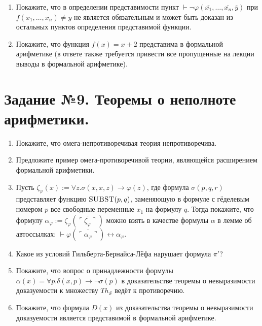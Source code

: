 \documentclass[10pt,a4paper,oneside]{article}
\begin{document}
\begin{enumerate}
\item Покажите, что в определении представимости пункт
$\vdash\neg\varphi(\overline{x_1},\dots,\overline{x_n},\overline{y})$ при $f(x_1,\dots,x_n) \ne y$ не является
обязательным и может быть доказан из остальных пунктов определения представимой функции.

\item Покажите, что функция $f(x) = x+2$ представима в формальной арифметике (в ответе также требуется привести все пропущенные
на лекции выводы в формальной арифметике).
\end{enumerate}

\section*{Задание №9. Теоремы о неполноте арифметики.}
\begin{enumerate}
\item Покажите, что омега-непротиворечивая теория непротиворечива.
\item Предложите пример омега-противоречивой теории, являющейся расширением формальной арифметики.
\item Пусть $\zeta_\varphi(x) := \forall z.\sigma (x,x,z) \rightarrow \varphi(z)$,
где формула $\sigma(p,q,r)$ представляет функцию $\textsc{SUBST}(p,q)$, заменяющую в формуле с гёделевым номером $p$
все свободные переменные $x_1$ на формулу $q$. Тогда покажите, что формулу $\alpha_\varphi := \zeta_\varphi(\overline{\ulcorner\zeta_\varphi\urcorner})$
можно взять в качестве формулы $\alpha$ в лемме об автоссылках: $\vdash \varphi(\overline{\ulcorner\alpha_\varphi\urcorner}) \leftrightarrow \alpha_\varphi$.

\item Какое из условий Гильберта-Бернайса-Лёфа нарушает формула $\pi'$?
\item Покажите, что вопрос о принадлежности формулы $\alpha(x) = \forall p.\delta(x,p) \rightarrow \neg \sigma(p)$ в доказательстве 
теоремы о невыразимости доказуемости к множеству $Th_\mathcal{S}$ ведёт к противоречию.
\item Покажите, что формула $D(x)$ из доказательства теоремы о невыразимости доказуемости является представимой в формальной арифметике.
\end{enumerate}
\end{document}
